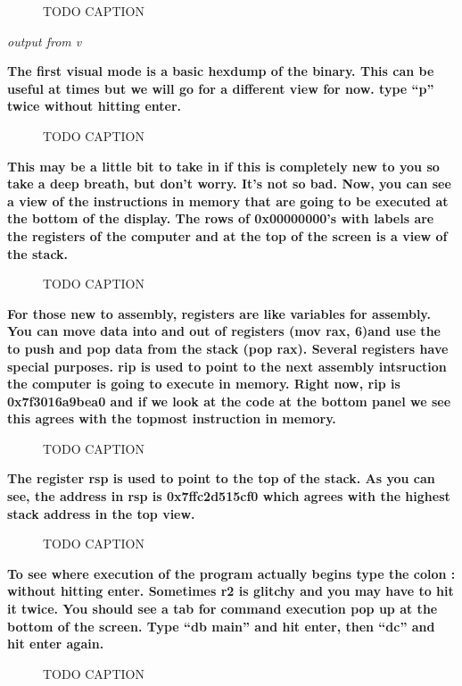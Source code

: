 \documentclass[letterpaper]{article}
\newcommand{\sitfig}[3]{
\begin{figure}[H]
\centering
\makebox[\textwidth][c]{
#2
}
\caption{#3}
\label{#1}
\end{figure}
}
\newcommand{\sitgfx}[4][scale=1.0]{
\sitfig{#3}{\texttt{[image: \#2]}}{#4}
}
\begin{document}
  
\sitgfx[width=5.8335in,height=3.6457in]{FINALWORKINGDOCFORMERLYPRECURSOR-img076.png}{fig:unk}{TODO CAPTION}
 

\textit{output from v}

\textbf{The first visual mode is a basic hexdump of the binary. This can be useful at times but we will go for a
different view for now. type ``p'' twice without hitting enter.}

  
\sitgfx[width=5.8335in,height=3.6457in]{FINALWORKINGDOCFORMERLYPRECURSOR-img077.png}{fig:unk}{TODO CAPTION}
 

\textbf{This may be a little bit to take in if this is completely new to you so take a deep breath, but don't worry.
It's not so bad. Now, you can see a view of the instructions in memory that are going to be executed at the bottom of
the display. The rows of 0x00000000's with labels are the registers of the computer and at the top of the screen is a
view of the stack.}

  
\sitgfx[width=5.8335in,height=3.6457in]{FINALWORKINGDOCFORMERLYPRECURSOR-img027.png}{fig:unk}{TODO CAPTION}
 

\textbf{For those new to assembly, registers are like variables for assembly. You can move data into and out of
registers (mov rax, 6)and use the to push and pop data from the stack (pop rax). Several registers have special
purposes. rip is used to point to the next assembly intsruction the computer is going to execute in memory. Right now,
rip is 0x7f3016a9bea0 and if we look at the code at the bottom panel we see this agrees with the topmost instruction in
memory.}

  
\sitgfx[width=5.8335in,height=3.6457in]{FINALWORKINGDOCFORMERLYPRECURSOR-img078.png}{fig:unk}{TODO CAPTION}
 

\textbf{The register rsp is used to point to the top of the stack. As you can see, the address in rsp is 0x7ffc2d515cf0
which agrees with the highest stack address in the top view.}

  
\sitgfx[width=5.8335in,height=3.6457in]{FINALWORKINGDOCFORMERLYPRECURSOR-img079.png}{fig:unk}{TODO CAPTION}
 

\textbf{To see where execution of the program actually begins type the colon : without hitting enter. Sometimes r2 is
glitchy and you may have to hit it twice. You should see a tab for command execution pop up at the bottom of the
screen. Type ``db main'' and hit enter, then ``dc'' and hit enter again.}

  
\sitgfx[width=5.8335in,height=3.6457in]{FINALWORKINGDOCFORMERLYPRECURSOR-img080.png}{fig:unk}{TODO CAPTION}
 
\end{document}
